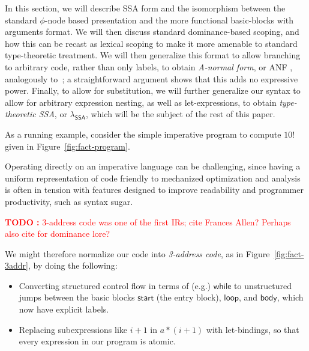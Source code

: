 \documentclass[acmsmall,screen,review]{acmart}
\newcounter{todos}
\newcommand{\TODO}[1]{{
  \stepcounter{todos}
  \begin{center}\large{\textcolor{red}{\textbf{TODO \arabic{todos}:} #1}}\end{center}
}}
\newcommand{\ms}[1]{\ensuremath{\mathsf{#1}}}
\newcommand{\isotopessa}{\(\lambda_{\ms{SSA}}\)}
\begin{document}
In this section, we will describe SSA form and the isomorphism between the standard $\phi$-node
based presentation and the more functional basic-blocks with arguments format. We will then discuss
standard dominance-based scoping, and how this can be recast as lexical scoping to make it more
amenable to standard type-theoretic treatment. We will then generalize this format to allow
branching to arbitrary code, rather than only labels, to obtain \textit{A-normal form}, or ANF
\cite{flanagan-93-anf}, analogously to~\citet{chakravarty-functional-ssa-2003}; a straightforward
argument shows that this adds no expressive power. Finally, to allow for substitution, we will
further generalize our syntax to allow for arbitrary expression nesting, as well as let-expressions,
to obtain \textit{type-theoretic SSA}, or \isotopessa, which will be the subject of the rest of this
paper.

As a running example, consider the simple imperative program to compute $10!$ given in
Figure~\ref{fig:fact-program}. 

Operating directly on an imperative language can be challenging, since having a uniform
representation of code friendly to mechanized optimization and analysis is often in tension with
features designed to improve readability and programmer productivity, such as syntax sugar. 


\TODO{3-address code was one of the first IRs; cite Frances Allen? Perhaps also cite
\cite{allen-70-cfa} for dominance lore?}

We might therefore normalize our code into \textit{3-address code}, as in
Figure~\ref{fig:fact-3addr}, by doing the following:
\begin{itemize}
  \item Converting structured control flow in terms of (e.g.) \ms{while} to unstructured jumps
  between the basic blocks \ms{start} (the entry block), \ms{loop}, and \ms{body}, which now have
  explicit labels. 
  \item Replacing subexpressions like $i + 1$ in $a * (i + 1)$ with let-bindings, so that every
  expression in our program is atomic. 
\end{itemize}
\end{document}
